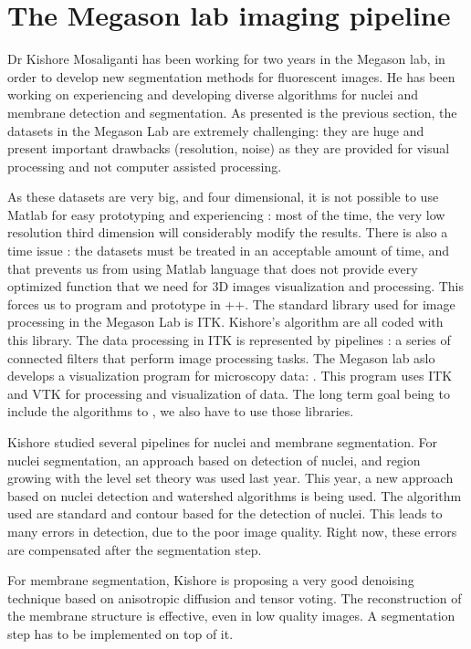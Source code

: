 \section{The Megason lab imaging pipeline}

Dr Kishore Mosaliganti has been working for two years in the Megason lab, in order to develop new segmentation methods for fluorescent images.
He has been working on experiencing and developing diverse algorithms for nuclei and membrane detection and segmentation.
As presented is the previous section, the datasets in the Megason Lab are extremely challenging:
they are huge and present important drawbacks (resolution, noise) as they are provided for visual processing and not computer assisted processing.

As these datasets are very big, and four dimensional, it is not possible to use Matlab for easy prototyping and experiencing : 
most of the time, the very low resolution third dimension will considerably modify the results.
There is also a time issue : the datasets must be treated in an acceptable amount of time,
and that prevents us from using Matlab language that does not provide every optimized function that we need for 3D images visualization and processing.
This forces us to program and prototype in {\C++}. The standard library used for image processing in the Megason Lab is ITK. Kishore's algorithm are all coded with this library.
The data processing in ITK is represented by pipelines : a series of connected filters that perform image processing tasks.
The Megason lab aslo develops a visualization program for microscopy data: {\gofigure}. This program uses ITK and VTK for processing and visualization of data. The long term goal being to include the algorithms to {\gofigure}, we also have to use those libraries.

Kishore studied several pipelines for nuclei and membrane segmentation.
For nuclei segmentation, an approach based on detection of nuclei, and region growing with the level set theory was used last year.
This year, a new approach based on nuclei detection and watershed algorithms is being used.
The algorithm used are standard and contour based for the detection of nuclei.
This leads to many errors in detection, due to the poor image quality. Right now, these errors are compensated after the segmentation step.

For membrane segmentation, Kishore is proposing a very good denoising technique based on anisotropic diffusion and tensor voting.
The reconstruction of the membrane structure is effective, even in low quality images. A segmentation step has to be implemented on top of it.


